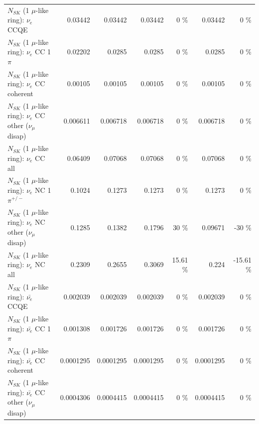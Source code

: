 \begin{table}
\begin{tabular}{| l | r | r | r  r | r  r |}
\hline
\hline
\hline
                                      $N_{SK}$ (1 $\mu$-like ring): $\nu_e$ CCQE &         0.03442 &         0.03442 &         0.03442 &        0 \%  &         0.03442 &        0 \%  \\ 
                                 $N_{SK}$ (1 $\mu$-like ring): $\nu_e$ CC 1$\pi$ &         0.02202 &          0.0285 &          0.0285 &        0 \%  &          0.0285 &        0 \%  \\ 
                               $N_{SK}$ (1 $\mu$-like ring): $\nu_e$ CC coherent &         0.00105 &         0.00105 &         0.00105 &        0 \%  &         0.00105 &        0 \%  \\ 
                $N_{SK}$ (1 $\mu$-like ring): $\nu_e$ CC other ($\nu_\mu$ disap) &        0.006611 &        0.006718 &        0.006718 &        0 \%  &        0.006718 &        0 \%  \\ 
                                  $N_{SK}$ (1 $\mu$-like ring): $\nu_{e}$ CC all &         0.06409 &         0.07068 &         0.07068 &        0 \%  &         0.07068 &        0 \%  \\ 
\hline
                           $N_{SK}$ (1 $\mu$-like ring): $\nu_e$ NC 1$\pi^{+/-}$ &          0.1024 &          0.1273 &          0.1273 &        0 \%  &          0.1273 &        0 \%  \\ 
                $N_{SK}$ (1 $\mu$-like ring): $\nu_e$ NC other ($\nu_\mu$ disap) &          0.1285 &          0.1382 &          0.1796 &       30 \%  &         0.09671 &      -30 \%  \\ 
                                  $N_{SK}$ (1 $\mu$-like ring): $\nu_{e}$ NC all &          0.2309 &          0.2655 &          0.3069 &    15.61 \%  &           0.224 &   -15.61 \%  \\ 
\hline
\hline
\hline
                                $N_{SK}$ (1 $\mu$-like ring): $\bar{\nu_e}$ CCQE &        0.002039 &        0.002039 &        0.002039 &        0 \%  &        0.002039 &        0 \%  \\ 
                           $N_{SK}$ (1 $\mu$-like ring): $\bar{\nu_e}$ CC 1$\pi$ &        0.001308 &        0.001726 &        0.001726 &        0 \%  &        0.001726 &        0 \%  \\ 
                         $N_{SK}$ (1 $\mu$-like ring): $\bar{\nu_e}$ CC coherent &       0.0001295 &       0.0001295 &       0.0001295 &        0 \%  &       0.0001295 &        0 \%  \\ 
          $N_{SK}$ (1 $\mu$-like ring): $\bar{\nu_e}$ CC other ($\nu_\mu$ disap) &       0.0004306 &       0.0004415 &       0.0004415 &        0 \%  &       0.0004415 &        0 \%  \\ 

\end{tabular}
\end{table}
